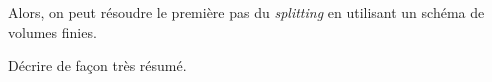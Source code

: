 \indent Alors, on peut résoudre le première pas du \emph{splitting} en utilisant un schéma de volumes finies.

\begingroup
\color{red}
Décrire de façon très résumé.
\endgroup

%
%
%
%
%
%
